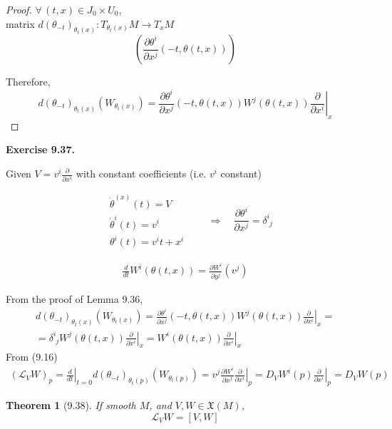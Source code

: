 \documentclass[11pt]{amsart}
\newtheorem{theorem}{Theorem}
\theoremstyle{definition}
\newcommand{\exercisehead}[1]{\medskip\noindent\textbf{Exercise #1.} }
\begin{document}
\begin{proof}
  $\forall \, (t,x ) \in J_0 \times U_0$, \\
  matrix $d(\theta_{-t})_{\theta_t(x)}: T_{\theta_t(x)}M \to T_xM$
\[
\left( \frac{ \partial \theta^i}{ \partial x^j}(-t, \theta(t,x)) \right)
\]

Therefore,
\[
d(\theta_{-t})_{\theta_t(x)}(W_{\theta_t(x)}) = \frac{ \partial \theta^i}{ \partial x^j}(-t,\theta(t,x)) W^j(\theta(t,x)) \left. \frac{ \partial }{ \partial x^i} \right|_x
\]

\end{proof}

\exercisehead{9.37}

Given $V = v^i \frac{ \partial }{ \partial x^i}$ with constant coefficients (i.e. $v^i$ constant)

\[
\begin{aligned}
  & \dot{\theta}^{(x)}(t) = V \\
  & \dot{\theta}^i(t) = v^i  \\
  & \theta^i(t)= v^it + x^i
\end{aligned} \quad \quad \Longrightarrow \quad
\frac{ \partial \theta^i}{ \partial x^j} = \delta^i_{ \, \, j}
\]

\[
\begin{gathered}
\frac{d}{dt} W^i(\theta(t,x))  = \frac{ \partial W^i}{ \partial y^j}(v^j)
\end{gathered}
\]

From the proof of Lemma 9.36,
\[
\begin{gathered}
  d(\theta_{-t})_{\theta_t(x)}(W_{\theta_t(x)}) = \frac{ \partial \theta^i}{ \partial x^j}(-t,\theta(t,x)) W^j(\theta(t,x)) \left. \frac{ \partial }{ \partial x^i} \right|_x = \\
 = \delta^i_{ \, \, j} W^j(\theta(t,x)) \left. \frac{ \partial }{ \partial x^i} \right|_x  = W^i(\theta(t,x)) \left. \frac{ \partial }{ \partial x^i} \right|_x
\end{gathered}
\]
From (9.16)
\[
\begin{gathered}
  (\mathcal{L}_VW)_p = \left. \frac{d}{dt} \right|_{t=0} d(\theta_{-t})_{\theta_t(p)}(W_{ \theta_t(p) } ) = v^j \frac{ \partial W^i}{ \partial x^j} \left. \frac{ \partial }{ \partial x^i} \right|_p = D_VW^i(p) \left. \frac{ \partial }{ \partial x^i} \right|_p = D_VW(p)
\end{gathered}
\]

\hrulefill

\begin{theorem}[9.38] If smooth $M$, and $V,W \in \mathfrak{X}(M)$,
\[
\mathcal{L}_VW = [V,W]
\]
\end{theorem}
\end{document}
